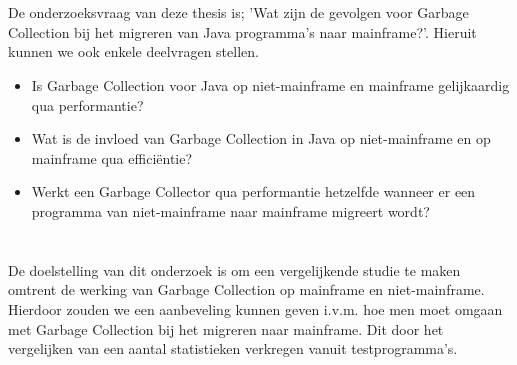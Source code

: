 \section{}%
\label{sec:onderzoeksvraag}

De onderzoeksvraag van deze thesis is; 'Wat zijn de gevolgen voor Garbage Collection bij het migreren van Java programma's naar mainframe?'.
Hieruit kunnen we ook enkele deelvragen stellen.

\begin{itemize}
    \item Is Garbage Collection voor Java op niet-mainframe en mainframe gelijkaardig qua performantie?
    \item Wat is de invloed van Garbage Collection in Java op niet-mainframe en op mainframe qua efficiëntie?
    \item Werkt een Garbage Collector qua performantie hetzelfde wanneer er een programma van niet-mainframe naar mainframe migreert wordt?
\end{itemize}



  

\section{}%
\label{sec:onderzoeksdoelstelling}

De doelstelling van dit onderzoek is om een vergelijkende studie te maken omtrent de werking van Garbage Collection op mainframe en niet-mainframe.
Hierdoor zouden we een aanbeveling kunnen geven i.v.m. hoe men moet omgaan met Garbage Collection bij het migreren naar mainframe.
Dit door het vergelijken van een aantal statistieken verkregen vanuit testprogramma's.


